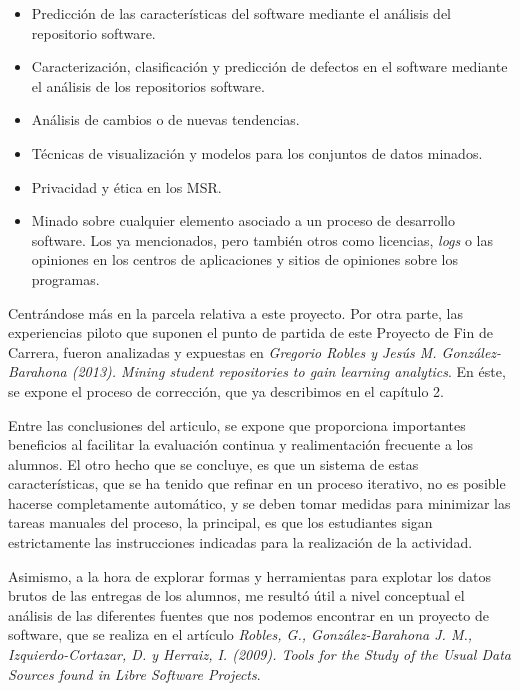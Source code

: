 \begin{itemize}
\item Predicción de las características del software mediante el análisis del repositorio software.

\item Caracterización, clasificación y predicción de defectos en el software mediante el análisis de los repositorios software.

\item Análisis de cambios o de nuevas tendencias.

\item Técnicas de visualización y modelos para los conjuntos de datos minados.

\item Privacidad y ética en los MSR.

\item Minado sobre cualquier elemento asociado a un proceso de desarrollo software. Los ya mencionados, pero también otros como licencias, \textit{logs} o las opiniones en los centros de aplicaciones y sitios de opiniones sobre los programas.
\end{itemize}


Centrándose más en la parcela relativa a este proyecto. Por otra parte, las experiencias piloto que suponen el punto de partida de este Proyecto de Fin de Carrera, fueron analizadas y expuestas en \textit{Gregorio Robles y Jesús M. González-Barahona (2013). Mining student repositories to gain learning analytics}. En éste, se expone el proceso de corrección, que ya describimos en el capítulo 2. 

Entre las conclusiones del articulo, se expone que proporciona importantes beneficios al facilitar la evaluación continua y realimentación frecuente a los alumnos. El otro hecho que se concluye, es que un sistema de estas características, que se ha tenido que refinar en un proceso iterativo, no es posible hacerse completamente automático, y se deben tomar medidas para minimizar las tareas manuales del proceso, la principal, es que los estudiantes sigan estrictamente las instrucciones indicadas para la realización de la actividad.


Asimismo, a la hora de explorar formas y herramientas para explotar los datos brutos de las entregas de los alumnos, me resultó útil a nivel conceptual el análisis de las diferentes fuentes que nos podemos encontrar en un proyecto de software, que se realiza en el artículo \textit{Robles, G., González-Barahona J. M., Izquierdo-Cortazar, D. y Herraiz, I. (2009). Tools for the Study of the Usual Data Sources found in Libre Software Projects}.


